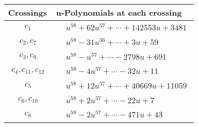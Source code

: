 \documentclass[1p]{elsarticle_modified}
\theoremstyle{definition}
\begin{document}
\begin{tabular}{m{50pt}|m{274pt}}
Crossings & \hspace{64pt}u-Polynomials at each crossing \\
\hline $$\begin{aligned}c_{1}\end{aligned}$$&$\begin{aligned}
&u^{58}+62 u^{57}+\cdots+142553 u+3481
\end{aligned}$\\
\hline $$\begin{aligned}c_{2},c_{7}\end{aligned}$$&$\begin{aligned}
&u^{58}-31 u^{56}+\cdots+3 u+59
\end{aligned}$\\
\hline $$\begin{aligned}c_{3},c_{9}\end{aligned}$$&$\begin{aligned}
&u^{58}- u^{57}+\cdots-2798 u+691
\end{aligned}$\\
\hline $$\begin{aligned}c_{4},c_{11},c_{12}\end{aligned}$$&$\begin{aligned}
&u^{58}-4 u^{57}+\cdots-32 u+11
\end{aligned}$\\
\hline $$\begin{aligned}c_{5}\end{aligned}$$&$\begin{aligned}
&u^{58}+12 u^{57}+\cdots+40669 u+11059
\end{aligned}$\\
\hline $$\begin{aligned}c_{6},c_{10}\end{aligned}$$&$\begin{aligned}
&u^{58}+2 u^{57}+\cdots-22 u+7
\end{aligned}$\\
\hline $$\begin{aligned}c_{8}\end{aligned}$$&$\begin{aligned}
&u^{58}-2 u^{57}+\cdots-471 u+43
\end{aligned}$\\
\hline
\end{tabular}\\~\\
\newpage\renewcommand{\arraystretch}{1}
\end{document}
